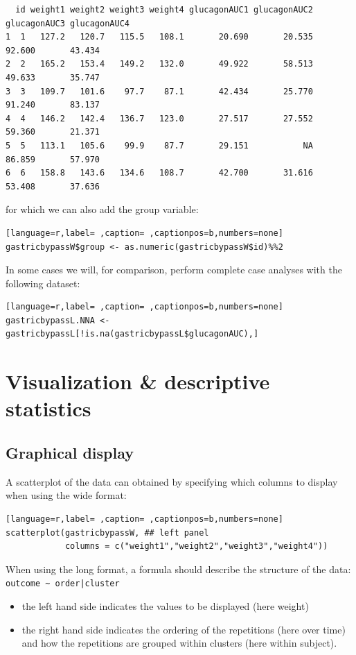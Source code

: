 \documentclass[12pt]{article}
\begin{document}
\begin{verbatim}
  id weight1 weight2 weight3 weight4 glucagonAUC1 glucagonAUC2 glucagonAUC3 glucagonAUC4
1  1   127.2   120.7   115.5   108.1       20.690       20.535       92.600       43.434
2  2   165.2   153.4   149.2   132.0       49.922       58.513       49.633       35.747
3  3   109.7   101.6    97.7    87.1       42.434       25.770       91.240       83.137
4  4   146.2   142.4   136.7   123.0       27.517       27.552       59.360       21.371
5  5   113.1   105.6    99.9    87.7       29.151           NA       86.859       57.970
6  6   158.8   143.6   134.6   108.7       42.700       31.616       53.408       37.636
\end{verbatim}


for which we can also add the group variable:
\begin{lstlisting}[language=r,label= ,caption= ,captionpos=b,numbers=none]
gastricbypassW$group <- as.numeric(gastricbypassW$id)%%2
\end{lstlisting}

In some cases we will, for comparison, perform complete case analyses
with the following dataset:
\begin{lstlisting}[language=r,label= ,caption= ,captionpos=b,numbers=none]
gastricbypassL.NNA <- gastricbypassL[!is.na(gastricbypassL$glucagonAUC),]
\end{lstlisting}

\clearpage

\section{Visualization \& descriptive statistics}
\label{sec:orgda606de}
\subsection{Graphical display}
\label{sec:orgb43fa0d}

A scatterplot of the data can obtained by specifying which columns to
display when using the wide format:
\begin{lstlisting}[language=r,label= ,caption= ,captionpos=b,numbers=none]
scatterplot(gastricbypassW, ## left panel
            columns = c("weight1","weight2","weight3","weight4")) 
\end{lstlisting}

\noindent When using the long format, a formula should describe the
structure of the data: \texttt{outcome \textasciitilde{} order|cluster}
\begin{itemize}
\item the left hand side indicates the values to be displayed (here weight)
\item the right hand side indicates the ordering of the repetitions (here over time) and
how the repetitions are grouped within clusters (here within subject).
\end{itemize}
\end{document}
